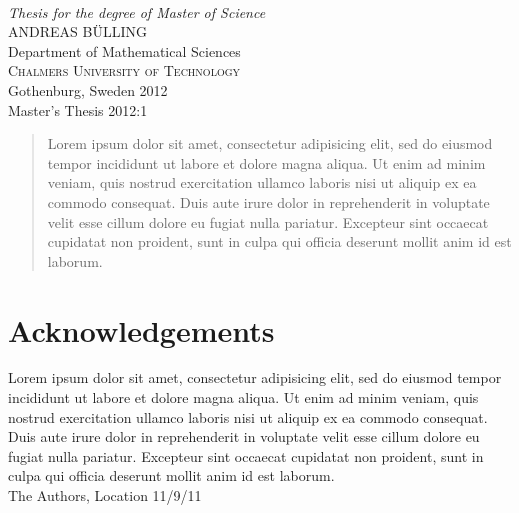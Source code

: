 \begin{titlepage}

\mbox{}
\vspace{50mm}
\begin{center} 
\textcolor{red}{
}
\end{center}

\mbox{}
\vfill
\addtolength{\voffset}{2cm}
\begin{flushleft}
	{ \\[0.5cm] \emph{\Large Thesis
            for the degree of Master of Science} \\[.8cm]
	
	{\huge ANDREAS B\"{U}LLING}\\[.8cm]
	
	{\Large Department of Mathematical Sciences \\
	\textsc{Chalmers University of Technology} \\
	Gothenburg, Sweden 2012 \\
	Master's Thesis 2012:1\\
	} 
	}
\end{flushleft}

\end{titlepage}
\ClearShipoutPicture

\pagestyle{empty}
\newpage
\clearpage
\mbox{}
\newpage
\clearpage
\thispagestyle{empty}

\begin{abstract}
Lorem ipsum dolor sit amet, consectetur adipisicing elit, sed do eiusmod tempor incididunt ut labore et dolore magna aliqua. Ut enim ad minim veniam, quis nostrud exercitation ullamco laboris nisi ut aliquip ex ea commodo consequat. Duis aute irure dolor in reprehenderit in voluptate velit esse cillum dolore eu fugiat nulla pariatur. Excepteur sint occaecat cupidatat non proident, sunt in culpa qui officia deserunt mollit anim id est laborum.
\end{abstract}

\newpage
\clearpage
\mbox{}
\newpage
\clearpage
\thispagestyle{empty}
\section*{Acknowledgements}
Lorem ipsum dolor sit amet, consectetur adipisicing elit, sed do eiusmod tempor incididunt ut labore et dolore magna aliqua. Ut enim ad minim veniam, quis nostrud exercitation ullamco laboris nisi ut aliquip ex ea commodo consequat. Duis aute irure dolor in reprehenderit in voluptate velit esse cillum dolore eu fugiat nulla pariatur. Excepteur sint occaecat cupidatat non proident, sunt in culpa qui officia deserunt mollit anim id est laborum. \\[1cm]

\hfill The Authors, Location 11/9/11
\newpage
\clearpage
\mbox{}
